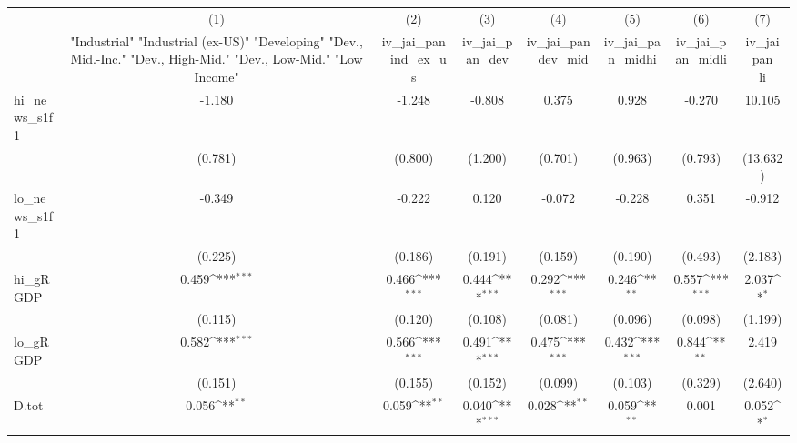 {
\def\sym#1{\ifmmode^{#1}\else\(^{#1}\)\fi}
\begin{tabular}{l*{7}{c}}
\toprule
            &\multicolumn{1}{c}{(1)}&\multicolumn{1}{c}{(2)}&\multicolumn{1}{c}{(3)}&\multicolumn{1}{c}{(4)}&\multicolumn{1}{c}{(5)}&\multicolumn{1}{c}{(6)}&\multicolumn{1}{c}{(7)}\\
            &\multicolumn{1}{c}{ "Industrial" "Industrial (ex-US)" "Developing" "Dev., Mid.-Inc." "Dev., High-Mid."  "Dev., Low-Mid." "Low Income" }&\multicolumn{1}{c}{iv\_jai\_pan\_ind\_ex\_us}&\multicolumn{1}{c}{iv\_jai\_pan\_dev}&\multicolumn{1}{c}{iv\_jai\_pan\_dev\_mid}&\multicolumn{1}{c}{iv\_jai\_pan\_midhi}&\multicolumn{1}{c}{iv\_jai\_pan\_midli}&\multicolumn{1}{c}{iv\_jai\_pan\_li}\\
\midrule
hi\_news\_s1f1&      -1.180         &      -1.248         &      -0.808         &       0.375         &       0.928         &      -0.270         &      10.105         \\
            &     (0.781)         &     (0.800)         &     (1.200)         &     (0.701)         &     (0.963)         &     (0.793)         &    (13.632)         \\
\addlinespace
lo\_news\_s1f1&      -0.349         &      -0.222         &       0.120         &      -0.072         &      -0.228         &       0.351         &      -0.912         \\
            &     (0.225)         &     (0.186)         &     (0.191)         &     (0.159)         &     (0.190)         &     (0.493)         &     (2.183)         \\
\addlinespace
hi\_gRGDP    &       0.459\sym{***}&       0.466\sym{***}&       0.444\sym{***}&       0.292\sym{***}&       0.246\sym{**} &       0.557\sym{***}&       2.037\sym{*}  \\
            &     (0.115)         &     (0.120)         &     (0.108)         &     (0.081)         &     (0.096)         &     (0.098)         &     (1.199)         \\
\addlinespace
lo\_gRGDP    &       0.582\sym{***}&       0.566\sym{***}&       0.491\sym{***}&       0.475\sym{***}&       0.432\sym{***}&       0.844\sym{**} &       2.419         \\
            &     (0.151)         &     (0.155)         &     (0.152)         &     (0.099)         &     (0.103)         &     (0.329)         &     (2.640)         \\
\addlinespace
D.tot       &       0.056\sym{**} &       0.059\sym{**} &       0.040\sym{***}&       0.028\sym{**} &       0.059\sym{**} &       0.001         &       0.052\sym{*}  \\

\end{tabular}}
